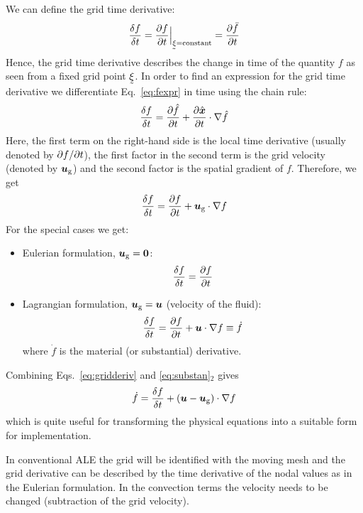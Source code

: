 We can define the grid time derivative:
\begin{equation}
   \frac{\delta f}{\delta t} = \pderiv{f}{t}\Big|_{\col\xi=\text{constant}}
                             = \pderiv{\bar f}{t}
\end{equation}
Hence, the grid time derivative describes the change in time of the quantity
$f$ as seen from a fixed grid point $\col\xi$.	In order to find an expression
for the grid time derivative we differentiate Eq.~\eqref{eq:fexpr} in time
using the chain rule:
\begin{equation}
   \frac{\delta f}{\delta t} = \dfrac{\partial \hat f}{\partial t}+\dfrac{\partial \hat{\boldsymbol{x}}}{\partial t}\cdot\nabla \hat f
\end{equation}
Here, the first term on the right-hand side is the local time derivative
(usually denoted by $\partial f/\partial t$), the first factor in the second term is
the grid velocity (denoted by $\boldsymbol{u}_\text{g}$) and the second factor is the
spatial gradient of $f$. Therefore, we get
\begin{equation}
   \frac{\delta f}{\delta t} = \dfrac{\partial f}{\partial t}+\boldsymbol{u}_\text{g}\cdot\nabla f
  \label{eq:gridderiv}
\end{equation}
For the special cases we get:
\begin{itemize}
   \item Eulerian formulation, $\boldsymbol{u}_\text{g}=\boldsymbol{0}$:
\begin{equation}
    \frac{\delta f}{\delta t} = \dfrac{\partial f}{\partial t}
\end{equation}
   \item Lagrangian formulation, $\boldsymbol{u}_\text{g}=\boldsymbol{u}$ (velocity of the
fluid):
\begin{equation}
    \frac{\delta f}{\delta t} = \dfrac{\partial f}{\partial t}+\boldsymbol{u}\cdot\nabla f\equiv\dot f
  \label{eq:substan}
\end{equation}
where $\dot f$ is the material (or substantial) derivative.
\end{itemize}
Combining Eqs.~\eqref{eq:gridderiv} and \eqref{eq:substan}$_2$ gives
\begin{equation}
    \dot f=\frac{\delta f}{\delta t}+ (\boldsymbol{u}-\boldsymbol{u}_\text{g})\cdot\nabla f
  \label{eq:substan2}
\end{equation}
which is quite useful for transforming the physical equations into a suitable
form for implementation.

In conventional ALE the grid will be identified with the moving mesh and
the grid
derivative can be described by the time derivative of the nodal values as in the
Eulerian formulation. In the convection terms the velocity needs to be
changed (subtraction of the grid velocity). 

